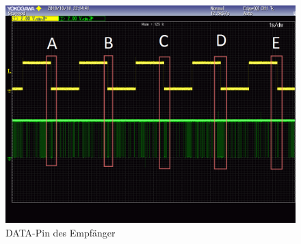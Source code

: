 \begin{figure}[H]
        \centering
        \hspace*{-1.7cm}
        \includegraphics[width=1.2\textwidth]{images/schmitt_trigger_billig_sender_bearbeitet.png}
        \caption{\si{DATA}-Pin des \funkempfaenger \platz Empfänger}        						\label{img:ausgang_sender_pin}
\end{figure}

